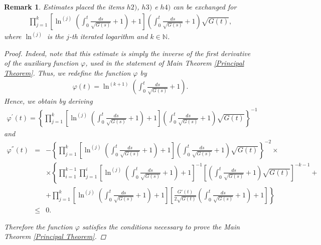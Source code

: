 \documentclass[a4paper]{amsart}
\newtheorem{remark}{Remark}
\begin{document}
\begin{remark}\label{remark3} 
Estimates placed the items $ h2)$, $h3)$ e $h4)$ can be exchanged for 
\begin{eqnarray}\label{condfi}
\prod_{j=1}^{k}\left[\ln^{(j)}\left(\int_{0}^{t}\frac{ds}{\sqrt{G(s)}} + 1\right)+1\right]\left(\int_{0}^{t}\frac{ds}{\sqrt{G(s)}} + 1\right)\sqrt{G(t)},
\end{eqnarray}
where $ \ln^{(j)} $ is the $j$-th iterated logarithm and $ k \in \mathbb{N} $.
\begin{proof} Indeed, note that this estimate is simply the inverse of the first derivative of the auxiliary function $ \varphi $, used in the statement of Main Theorem \ref{Principal Theorem}. Thus, we redefine the function $ \varphi $ by
\begin{eqnarray*}
\varphi(t) = \ln^{(k+1)}\left(\int_{0}^{t}\frac{ds}{\sqrt{G(s)}} + 1\right).
\end{eqnarray*}
Hence, we obtain by deriving
\begin{eqnarray*}
\varphi^{'}(t)= \left\{\prod_{j=1}^{k}\left[\ln^{(j)}\left(\int_{0}^{t}\frac{ds}{\sqrt{G(s)}} + 1\right)+1\right]\left(\int_{0}^{t}\frac{ds}{\sqrt{G(s)}} + 1\right)\sqrt{G(t)}\right\}^{-1}
\end{eqnarray*}
and
\begin{eqnarray*}
\varphi^{''}(t) &=& -\left\{\prod_{j=1}^{k}\left[\ln^{(j)}\left(\int_{0}^{t}\frac{ds}{\sqrt{G(s)}} + 1\right)+1\right]\left(\int_{0}^{t}\frac{ds}{\sqrt{G(s)}} + 1\right)\sqrt{G(t)}\right\}^{-2}\times \nonumber \\
& &\times\left\{\prod_{i=1}^{k-1}\prod_{j=1}^{i}\left[\ln^{(j)}\left(\int_{0}^{t}\frac{ds}{\sqrt{G(s)}} + 1\right)+1\right]^{-1}\left[\left(\int_{0}^{t}\frac{ds}{\sqrt{G(s)}} + 1\right)\sqrt{G(t)}\right]^{-k-1} + \right. \nonumber \\
& &\left. + \prod_{j=1}^{k}\left[\ln^{(j)}\left(\int_{0}^{t}\frac{ds}{\sqrt{G(s)}} + 1\right)+1\right]\left[\frac{G'(t)}{2\sqrt{G(t)}}\left(\int_{0}^{t}\frac{ds}{\sqrt{G(s)}} + 1\right) + 1 \right]\right\} \nonumber \\
&\leq & 0.
\end{eqnarray*}

Therefore the function $ \varphi $ satisfies the conditions necessary to prove the Main Theorem \ref{Principal Theorem}.
\end{proof}
\end{remark}
\end{document}
